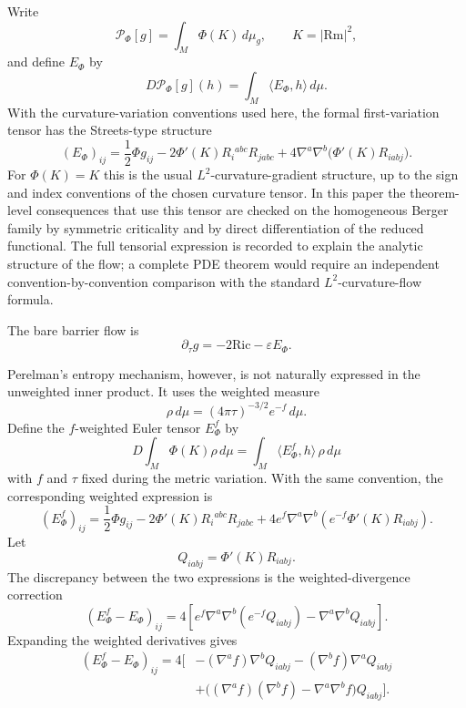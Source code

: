 \documentclass[11pt]{amsart}
\newcommand{\Rm}{\mathrm{Rm}}
\newcommand{\Ric}{\mathrm{Ric}}
\newcommand{\dt}{\partial_\tau}
\begin{document}
Write
\[
        \mathcal P_\Phi[g]=\int_M\Phi(K)\,d\mu_g,
        \qquad K=|\Rm|^2,
\]
and define \(E_\Phi\) by
\[
        D\mathcal P_\Phi[g](h)
        =
        \int_M \langle E_\Phi,h\rangle\,d\mu .
\]
With the curvature-variation conventions used here, the formal first-variation
tensor has the Streets-type structure
\[
        (E_\Phi)_{ij}
        =
        \frac12\Phi g_{ij}
        -
        2\Phi'(K)R_i{}^{abc}R_{jabc}
        +
        4\nabla^a\nabla^b\bigl(\Phi'(K)R_{iabj}\bigr).
\]
For \(\Phi(K)=K\) this is the usual \(L^2\)-curvature-gradient structure,
up to the sign and index conventions of the chosen curvature tensor.  In this
paper the theorem-level consequences that use this tensor are checked on the
homogeneous Berger family by symmetric criticality and by direct differentiation
of the reduced functional.  The full tensorial expression is recorded to explain
the analytic structure of the flow; a complete PDE theorem would require an
independent convention-by-convention comparison with the standard
\(L^2\)-curvature-flow formula.

The bare barrier flow is
\[
        \dt g=-2\Ric-\varepsilon E_\Phi .
\]

Perelman's entropy mechanism, however, is not naturally expressed in the
unweighted inner product.  It uses the weighted measure
\[
        \rho\,d\mu=(4\pi\tau)^{-3/2}e^{-f}\,d\mu .
\]
Define the \(f\)-weighted Euler tensor \(E_\Phi^f\) by
\[
        D\int_M\Phi(K)\rho\,d\mu
        =
        \int_M\langle E_\Phi^f,h\rangle\,\rho\,d\mu
\]
with \(f\) and \(\tau\) fixed during the metric variation.  With the same convention, the corresponding weighted expression is
\[
        (E_\Phi^f)_{ij}
        =
        \frac12\Phi g_{ij}
        -
        2\Phi'(K)R_i{}^{abc}R_{jabc}
        +
        4e^f\nabla^a\nabla^b
        \left(e^{-f}\Phi'(K)R_{iabj}\right).
\]
Let
\[
        Q_{iabj}=\Phi'(K)R_{iabj}.
\]
The discrepancy between the two expressions is the weighted-divergence
correction
\[
        (E_\Phi^f-E_\Phi)_{ij}
        =
        4\left[
        e^f\nabla^a\nabla^b(e^{-f}Q_{iabj})
        -
        \nabla^a\nabla^bQ_{iabj}
        \right].
\]
Expanding the weighted derivatives gives
\[
\begin{aligned}
        (E_\Phi^f-E_\Phi)_{ij}
        =
        4\big[
        &-(\nabla^a f)\nabla^bQ_{iabj}
        -(\nabla^b f)\nabla^aQ_{iabj}  \\
        &+
        \big((\nabla^a f)(\nabla^b f)-\nabla^a\nabla^b f\big)Q_{iabj}
        \big].
\end{aligned}
\]
\end{document}
